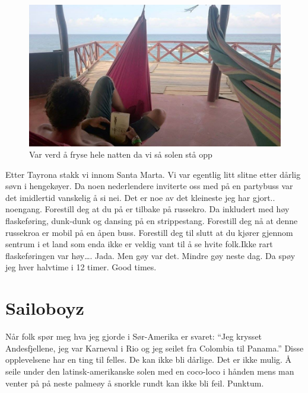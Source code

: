 \begin{figure}[H]
	\centering
	\includegraphics[width=\textwidth]{soveikoye}
	\caption*{Var verd å fryse hele natten da vi så solen stå opp}
	\label{fig:sovekolasj}
\end{figure}

Etter Tayrona stakk vi innom Santa Marta. Vi var egentlig litt slitne
etter dårlig søvn i hengekøyer. Da noen nederlendere inviterte oss med
på en partybuss var det imidlertid vanskelig å si nei. Det er
noe av det kleineste jeg har gjort.. noengang. Forestill deg at du på
er tilbake på russekro. Da inkludert med høy flaskeføring, dunk-dunk
og dansing på en strippestang. Forestill deg nå at denne russekroa er
mobil på en åpen buss. Forestill deg til slutt at du kjører gjennom
sentrum i et land som enda ikke er veldig vant til å se hvite folk.Ikke rart flaskeføringen var
høy\ldots. Jada. Men gøy var det. Mindre gøy neste dag. Da spøy jeg
hver halvtime i 12 timer. Good times. 

\section{Sailoboyz}

Når folk spør meg hva jeg gjorde i Sør-Amerika er svaret: ``Jeg
krysset Andesfjellene, jeg var  Karneval i Rio og jeg seilet fra Colombia
til Panama.'' Disse opplevelsene har en ting til felles. De kan ikke
bli dårlige. Det er ikke mulig. Å seile under den
latinsk-amerikanske solen med en coco-loco i hånden mens man venter på
på neste palmeøy å snorkle rundt kan ikke bli feil. Punktum.

